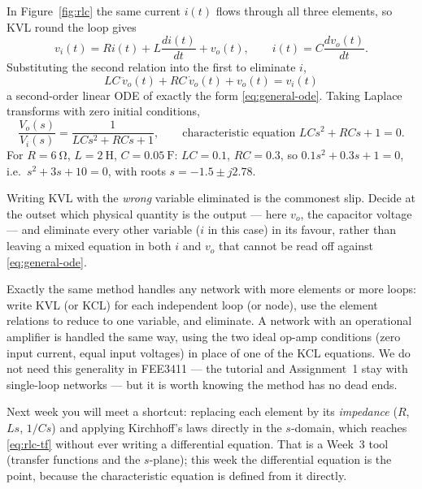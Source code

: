 \documentclass[11pt,a4paper]{article}
\begin{document}
\begin{workedex}[title=Worked example 2.1 --- series $RLC$ network]
In Figure~\ref{fig:rlc} the same current $i(t)$ flows through all three
elements, so KVL round the loop gives
\[
  v_i(t) = Ri(t) + L\frac{di(t)}{dt} + v_o(t), \qquad i(t)=C\frac{dv_o(t)}{dt}.
\]
Substituting the second relation into the first to eliminate $i$,
\begin{equation}
  \boxed{\;LC\,\ddot v_o(t) + RC\,\dot v_o(t) + v_o(t) = v_i(t)\;}
  \label{eq:rlc-ode}
\end{equation}
a second-order linear ODE of exactly the form \eqref{eq:general-ode}. Taking
Laplace transforms with zero initial conditions,
\begin{equation}
  \frac{V_o(s)}{V_i(s)} = \frac{1}{LCs^2+RCs+1},
  \qquad\text{characteristic equation } LCs^2+RCs+1=0 .
  \label{eq:rlc-tf}
\end{equation}
For $R=\SI{6}{\ohm}$, $L=\SI{2}{\henry}$, $C=\SI{0.05}{\farad}$: $LC=0.1$,
$RC=0.3$, so $0.1s^2+0.3s+1=0$, i.e.\ $s^2+3s+10=0$, with roots
$s=-1.5\pm j2.78$.
\end{workedex}

\begin{pitfall}
Writing KVL with the \emph{wrong} variable eliminated is the commonest slip.
Decide at the outset which physical quantity is the output --- here $v_o$, the
capacitor voltage --- and eliminate every other variable ($i$ in this case) in
its favour, rather than leaving a mixed equation in both $i$ and $v_o$ that
cannot be read off against \eqref{eq:general-ode}.
\end{pitfall}

Exactly the same method handles any network with more elements or more loops:
write KVL (or KCL) for each independent loop (or node), use the element
relations to reduce to one variable, and eliminate. A network with an
operational amplifier is handled the same way, using the two ideal op-amp
conditions (zero input current, equal input voltages) in place of one of the
KCL equations. We do not need this generality in FEE3411 --- the tutorial and
Assignment~1 stay with single-loop networks --- but it is worth knowing the
method has no dead ends.

\begin{keyidea}
Next week you will meet a shortcut: replacing each element by its
\emph{impedance} ($R$, $Ls$, $1/Cs$) and applying Kirchhoff's laws directly in
the $s$-domain, which reaches \eqref{eq:rlc-tf} without ever writing a
differential equation. That is a Week~3 tool (transfer functions and the
$s$-plane); this week the differential equation is the point, because the
characteristic equation is defined from it directly.
\end{keyidea}
\end{document}
